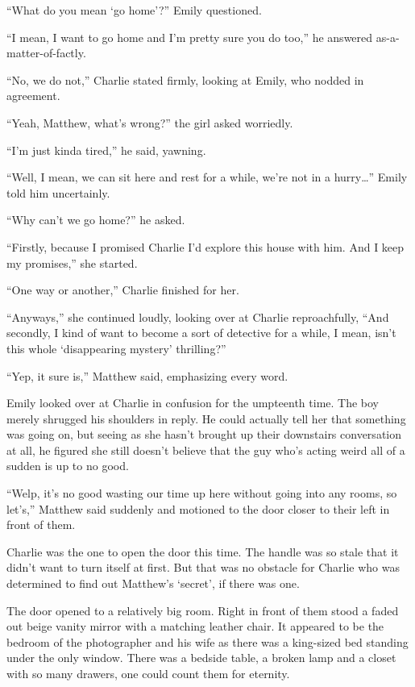 “What do you mean ‘go home'?” Emily questioned.

“I mean, I want to go home and I'm pretty sure you do too,” he answered as-a-matter-of-factly.

“No, we do not,” Charlie stated firmly, looking at Emily, who nodded in agreement.

“Yeah, Matthew, what's wrong?” the girl asked worriedly.

“I'm just kinda tired,” he said, yawning.

“Well, I mean, we can sit here and rest for a while, we're not in a hurry…” Emily told him uncertainly.

“Why can't we go home?” he asked.

“Firstly, because I promised Charlie I'd explore this house with him. And I keep my promises,” she started.

“One way or another,” Charlie finished for her.

“Anyways,” she continued loudly, looking over at Charlie reproachfully, “And secondly, I kind of want to become a sort of detective for a while, I mean, isn't this whole ‘disappearing mystery' thrilling?”

“Yep, it sure is,” Matthew said, emphasizing every word.

Emily looked over at Charlie in confusion for the umpteenth time. The boy merely shrugged his shoulders in reply. He could actually tell her that something was going on, but seeing as she hasn't brought up their downstairs conversation at all, he figured she still doesn't believe that the guy who's acting weird all of a sudden is up to no good.

“Welp, it's no good wasting our time up here without going into any rooms, so let's,” Matthew said suddenly and motioned to the door closer to their left in front of them.

Charlie was the one to open the door this time. The handle was so stale that it didn't want to turn itself at first. But that was no obstacle for Charlie who was determined to find out Matthew's ‘secret', if there was one.

The door opened to a relatively big room. Right in front of them stood a faded out beige vanity mirror with a matching leather chair. It appeared to be the bedroom of the photographer and his wife as there was a king-sized bed standing under the only window. There was a bedside table, a broken lamp and a closet with so many drawers, one could count them for eternity.

